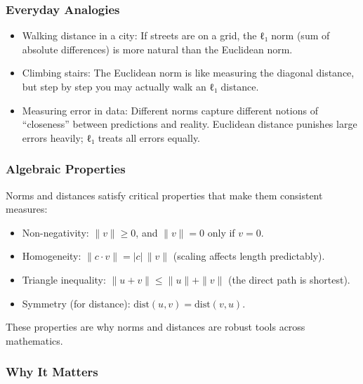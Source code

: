 \documentclass[
  letterpaper,
  DIV=11,
  numbers=noendperiod]{scrreprt}
\providecommand{\tightlist}{%
  \setlength{\itemsep}{0pt}\setlength{\parskip}{0pt}}
\begin{document}
\subsubsection{Everyday Analogies}\label{everyday-analogies-2}

\begin{itemize}
\tightlist
\item
  Walking distance in a city: If streets are on a grid, the ℓ₁ norm (sum
  of absolute differences) is more natural than the Euclidean norm.
\item
  Climbing stairs: The Euclidean norm is like measuring the diagonal
  distance, but step by step you may actually walk an ℓ₁ distance.
\item
  Measuring error in data: Different norms capture different notions of
  ``closeness'' between predictions and reality. Euclidean distance
  punishes large errors heavily; ℓ₁ treats all errors equally.
\end{itemize}

\subsubsection{Algebraic Properties}\label{algebraic-properties-2}

Norms and distances satisfy critical properties that make them
consistent measures:

\begin{itemize}
\tightlist
\item
  Non-negativity: \(\|v\| \geq 0\), and \(\|v\| = 0\) only if
  \(v = 0\).\\
\item
  Homogeneity: \(\|c \cdot v\| = |c| \, \|v\|\) (scaling affects length
  predictably).\\
\item
  Triangle inequality: \(\|u + v\| \leq \|u\| + \|v\|\) (the direct path
  is shortest).\\
\item
  Symmetry (for distance): \(\text{dist}(u, v) = \text{dist}(v, u)\).
\end{itemize}

These properties are why norms and distances are robust tools across
mathematics.

\subsubsection{Why It Matters}\label{why-it-matters-4}
\end{document}
